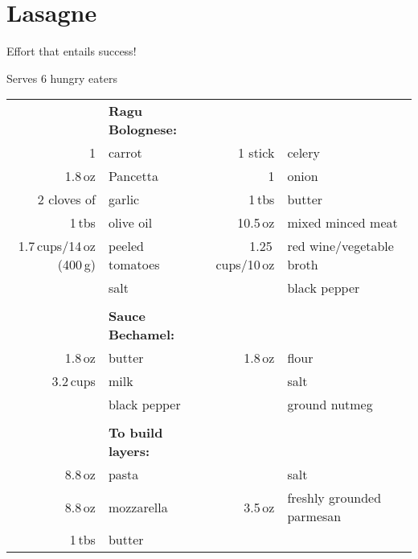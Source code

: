 \section{Lasagne}
\large{Effort that entails success!}
\begin{centering}
Serves 6 hungry eaters
\end{centering}
\begin{table}[H]
  \centering
  \begin{tabular*}{1\textwidth}{rlrl}
    &\textbf{Ragu Bolognese:}&&\\
    1 & carrot & 1 stick & celery \\
    1.8\,oz  & Pancetta & 1 & onion \\
    2 cloves of & garlic &1\,tbs & butter\\
    1\,tbs & olive oil & 10.5\,oz&mixed minced meat\\
    1.7\,cups/14\,oz (400\,g)&peeled tomatoes&1.25\,cups/10\,oz& red wine/vegetable broth\\
    &salt & & black pepper\\
    &&&\\

    &\textbf{Sauce Bechamel:}&&\\
    1.8\,oz & butter & 1.8\,oz & flour \\
    3.2\,cups & milk & & salt \\
    &black pepper& & ground nutmeg\\
    &&&\\
    &\textbf{To build layers:}&&\\
    8.8\,oz & pasta  & & salt\\
    8.8\,oz & mozzarella & 3.5\,oz & freshly grounded parmesan\\
    1\,tbs & butter
  \end{tabular*}
\end{table}

